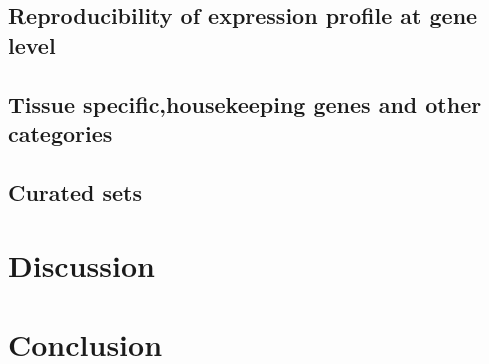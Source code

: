     \subsection{Reproducibility of expression profile at gene level}
    \label{sec:Trans_ReproExpresGene}

    \subsection{Tissue specific,housekeeping genes and other categories}
    \label{sec:Trans_TissueSpeAndHK}

    \subsection{Curated sets}
    \label{sec:Trans_curatedSets}

\section{Discussion}
\label{sec:Trans_discussion}

\section{Conclusion}
\label{sec:Trans_conclusion}


